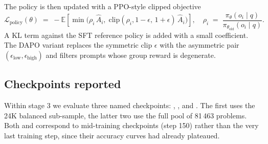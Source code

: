 The policy is then updated with a PPO-style clipped objective
\begin{equation}
\mathcal{L}_{\text{policy}}(\theta) \;=\;
- \mathbb{E}\!\left[\min\!\Big(\rho_i\, \hat A_i,\;
  \mathrm{clip}(\rho_i, 1-\epsilon,\, 1+\epsilon)\, \hat A_i\Big)\right],
\quad
\rho_i \;=\; \frac{\pi_\theta(o_i \mid q)}{\pi_{\theta_{\text{old}}}(o_i \mid q)}.
\label{eq:ppo}
\end{equation}
A KL term against the SFT reference policy is added with a small
coefficient. The DAPO variant replaces the symmetric clip $\epsilon$ with
the asymmetric pair $(\epsilon_{\text{low}}, \epsilon_{\text{high}})$ and
filters prompts whose group reward is degenerate.

\subsection{Checkpoints reported}
Within stage 3 we evaluate three named checkpoints:
, , and . The first uses the
24K balanced sub-sample, the latter two use the full
 pool of 81\,463 problems. Both  and 
correspond to mid-training checkpoints (step 150) rather than the very last
training step, since their accuracy curves had already plateaued.
